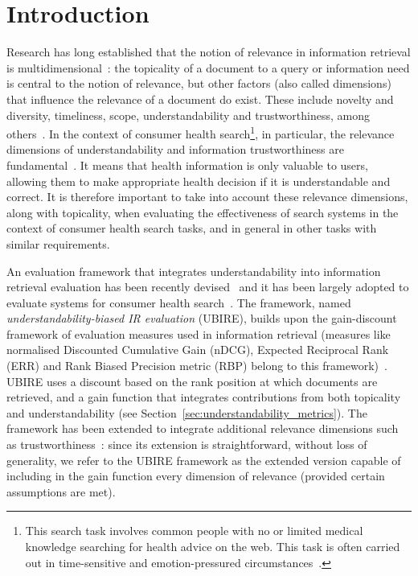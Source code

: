 \section{Introduction}
\label{chp:evaluation_metrics}

Research has long established that the notion of relevance in information retrieval is multidimensional~\cite{schamber94,borlund03}: the topicality of a document to a query or information need is central to the notion of relevance, but other factors (also called dimensions) that influence the relevance of a document do exist. These include novelty and diversity, timeliness, scope, understandability and trustworthiness, among others~\cite{park93,schamber94}. In the context of consumer health search\footnote{This search task involves common people with no or limited medical knowledge searching for health advice on the web. This task is often carried out in time-sensitive and emotion-pressured circumstances~\cite{hersh08,mishra2014time}.}, in particular, the relevance dimensions of understandability and information trustworthiness are fundamental~\cite{hersh08}. 
It means that health information is only valuable to users, allowing them to make appropriate health decision if it is understandable and correct. 
It is therefore important to take into account these relevance dimensions, along with topicality, when evaluating the effectiveness of search systems in the context of consumer health search tasks, and in general in other tasks with similar requirements.

An evaluation framework that integrates understandability into information retrieval evaluation has been recently devised~\cite{zuccon14,zuccon16} and it has been largely adopted to evaluate systems for consumer health search~\cite{clefIR15,clefIR16,clefIR17}. The framework, named \textit{understandability-biased IR evaluation} (UBIRE), builds upon the gain-discount framework of evaluation measures used in information retrieval (measures like normalised Discounted Cumulative Gain (nDCG),
Expected Reciprocal Rank (ERR) and Rank Biased Precision metric (RBP) belong to this framework)~\cite{carterette11}. UBIRE uses a discount based on the rank position at which documents are retrieved, and a gain function that integrates contributions from both topicality and understandability (see Section~\ref{sec:understandability_metrics}). The framework has been extended to integrate additional relevance dimensions such as trustworthiness~\cite{clefIR17}: since its extension is straightforward, without loss of generality, we refer to the UBIRE framework as the extended version capable of including in the gain function every dimension of relevance (provided certain assumptions are met). 

